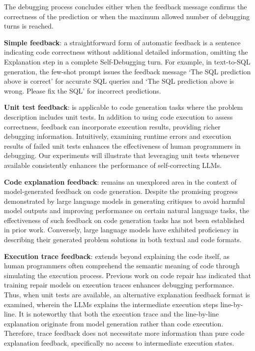 \documentclass[a4paper,oneside]{book}
\begin{document}
The debugging process concludes either when the feedback message confirms the correctness of the prediction or when the maximum allowed number of debugging turns is reached.

\textbf{Simple feedback}: a straightforward form of automatic feedback is a sentence indicating code correctness without additional detailed information, omitting the Explanation step in a complete Self-Debugging turn. For example, in text-to-SQL generation, the few-shot prompt issues the feedback message `The SQL prediction above is correct' for accurate SQL queries and `The SQL prediction above is wrong. Please fix the SQL' for incorrect predictions.

\textbf{Unit test feedback}: is applicable to code generation tasks where the problem description includes unit tests. In addition to using code execution to assess correctness, feedback can incorporate execution results, providing richer debugging information. Intuitively, examining runtime errors and execution results of failed unit tests enhances the effectiveness of human programmers in debugging. Our experiments will illustrate that leveraging unit tests whenever available consistently enhances the performance of self-correcting LLMs.

\textbf{Code explanation feedback}: remains an unexplored area in the context of model-generated feedback on code generation. Despite the promising progress demonstrated by large language models in generating critiques to avoid harmful model outputs and improving performance on certain natural language tasks, the effectiveness of such feedback on code generation tasks has not been established in prior work. Conversely, large language models have exhibited proficiency in describing their generated problem solutions in both textual and code formats.

\textbf{Execution trace feedback}: extends beyond explaining the code itself, as human programmers often comprehend the semantic meaning of code through simulating the execution process. Previous work on code repair has indicated that training repair models on execution traces enhances debugging performance. Thus, when unit tests are available, an alternative explanation feedback format is examined, wherein the LLMs explains the intermediate execution steps line-by-line. It is noteworthy that both the execution trace and the line-by-line explanation originate from model generation rather than code execution. Therefore, trace feedback does not necessitate more information than pure code explanation feedback, specifically no access to intermediate execution states.
\end{document}
